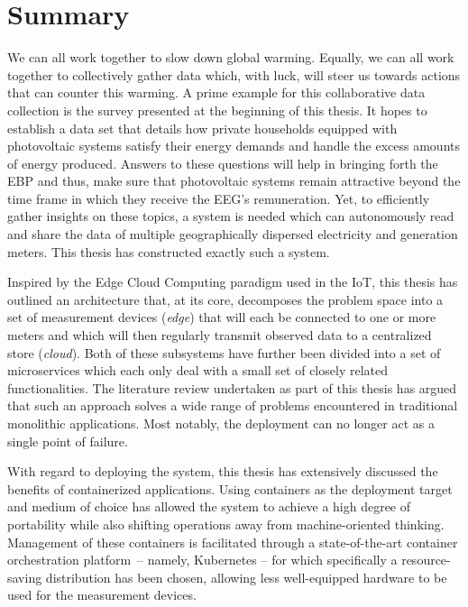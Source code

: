 
\chapter{Summary}
\label{chp:summary}

We can all work together to slow down global warming. Equally, we can all work together to collectively gather data which, with luck, will steer us towards actions that can counter this warming. A prime example for this collaborative data collection is the survey presented at the beginning of this thesis. It hopes to establish a data set that details how private households equipped with photovoltaic systems satisfy their energy demands and handle the excess amounts of energy produced. Answers to these questions will help in bringing forth the \acl{EBP} and thus, make sure that photovoltaic systems remain attractive beyond the time frame in which they receive the \acs{EEG}'s remuneration. Yet, to efficiently gather insights on these topics, a system is needed which can autonomously read and share the data of multiple geographically dispersed electricity and generation meters. This thesis has constructed exactly such a system.

Inspired by the Edge Cloud Computing paradigm used in the \acl{IoT}, this thesis has outlined an architecture that, at its core, decomposes the problem space into a set of measurement devices (\textit{edge}) that will each be connected to one or more meters and which will then regularly transmit observed data to a centralized store (\textit{cloud}). Both of these subsystems have further been divided into a set of microservices which each only deal with a small set of closely related functionalities. The literature review undertaken as part of this thesis has argued that such an approach solves a wide range of problems encountered in traditional monolithic applications. Most notably, the deployment can no longer act as a single point of failure.

With regard to deploying the system, this thesis has extensively discussed the benefits of containerized applications. Using containers as the deployment target and medium of choice has allowed the system to achieve a high degree of portability while also shifting operations away from machine-oriented thinking. Management of these containers is facilitated through a state-of-the-art container orchestration platform~-- namely, Kubernetes -- for which specifically a resource-saving distribution has been chosen, allowing less well-equipped hardware to be used for the measurement devices. 

